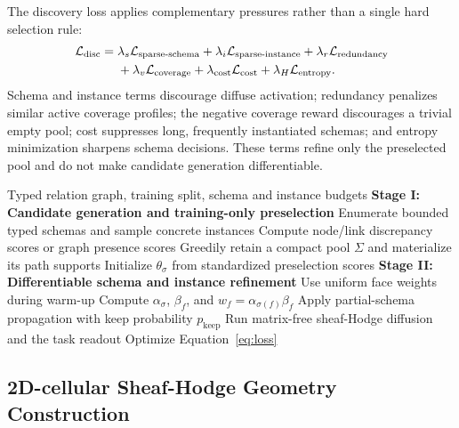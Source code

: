 The discovery loss applies complementary pressures rather than a single hard selection rule:
\begin{equation}
  \begin{aligned}
  \mathcal{L}_{\mathrm{disc}}={}&
  \lambda_s\mathcal{L}_{\mathrm{sparse\text{-}schema}}
  +\lambda_i\mathcal{L}_{\mathrm{sparse\text{-}instance}}
  +\lambda_r\mathcal{L}_{\mathrm{redundancy}}\\
  &+\lambda_v\mathcal{L}_{\mathrm{coverage}}
  +\lambda_{\mathrm{cost}}\mathcal{L}_{\mathrm{cost}}
  +\lambda_H\mathcal{L}_{\mathrm{entropy}} .
  \end{aligned}
  \label{eq:discovery-loss}
\end{equation}
Schema and instance terms discourage diffuse activation; redundancy penalizes similar active
coverage profiles; the negative coverage reward discourages a trivial empty pool; cost suppresses
long, frequently instantiated schemas; and entropy minimization sharpens schema decisions.  These
terms refine only the preselected pool and do not make candidate generation differentiable.

\begin{algorithm}[t]
  \caption{\ampss{} candidate preselection and differentiable refinement}
  \label{alg:ampss}
  \begin{algorithmic}[1]
    \REQUIRE Typed relation graph, training split, schema and instance budgets
    \STATE \textbf{Stage I: Candidate generation and training-only preselection}
    \STATE Enumerate bounded typed schemas and sample concrete instances
    \STATE Compute node/link discrepancy scores or graph presence scores
    \STATE Greedily retain a compact pool \(\Sigma\) and materialize its path supports
    \STATE Initialize \(\theta_\sigma\) from standardized preselection scores
      \STATE \textbf{Stage II: Differentiable schema and instance refinement}
      \STATE Use uniform face weights during warm-up
      \STATE Compute \(\alpha_\sigma\), \(\beta_f\), and \(w_f=\alpha_{\sigma(f)}\beta_f\)
      \STATE Apply partial-schema propagation with keep probability \(p_{\mathrm{keep}}\)
      \STATE Run matrix-free sheaf-Hodge diffusion and the task readout
      \STATE Optimize Equation~\ref{eq:loss}
    \ENDFOR
  \end{algorithmic}
\end{algorithm}

\subsection{2D-cellular Sheaf-Hodge Geometry Construction}

